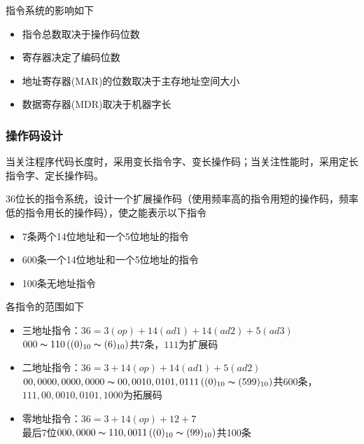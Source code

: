 指令系统的影响如下
\begin{itemize}
	\item 指令总数取决于操作码位数
	\item 寄存器决定了编码位数
	\item 地址寄存器(MAR)的位数取决于主存地址空间大小
	\item 数据寄存器(MDR)取决于机器字长
\end{itemize}

\subsubsection{操作码设计}
当关注程序代码长度时，采用变长指令字、变长操作码；当关注性能时，采用定长指令字、定长操作码。
\begin{example}
36位长的指令系统，设计一个扩展操作码（使用频率高的指令用短的操作码，频率低的指令用长的操作码），使之能表示以下指令
\begin{itemize}
	\item 7条两个14位地址和一个5位地址的指令
	\item 600条一个14位地址和一个5位地址的指令
	\item 100条无地址指令
\end{itemize}
\end{example}
\begin{analysis}
各指令的范围如下
\begin{itemize}
\item 三地址指令：$36=3(op)+14(ad1)+14(ad2)+5(ad3)$\\
$000\thicksim 110\,((0)_{10}\thicksim(6)_{10})$共7条，$111$为扩展码
\item 二地址指令：$36=3+14(op)+14(ad1)+5(ad2)$\\
$00,0000,0000,0000\thicksim 00,0010,0101,0111\,((0)_{10}\thicksim(599)_{10})$共600条，$111,00,0010,0101,1000$为拓展码
\item 零地址指令：$36=3+14(op)+12+7$\\
最后7位$000,0000\thicksim 110,0011\,((0)_{10}\thicksim(99)_{10})$共100条
\end{itemize}
\end{analysis}

